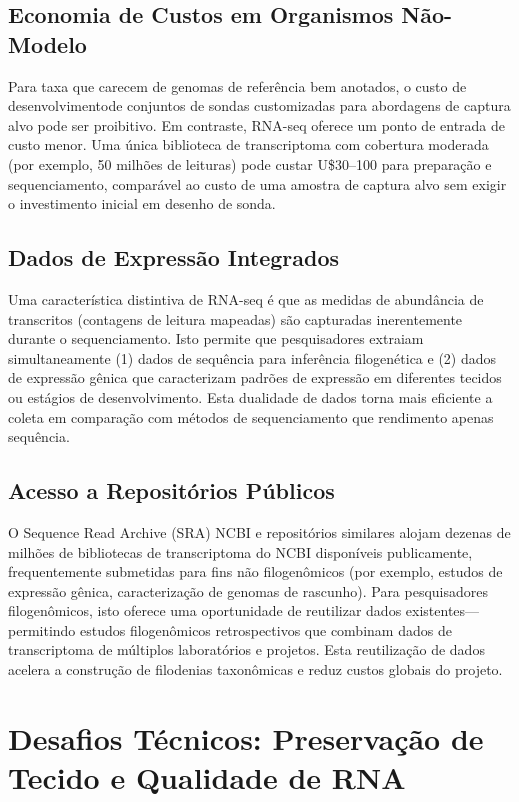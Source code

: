 \subsection{Economia de Custos em Organismos Não-Modelo}

Para taxa que carecem de genomas de referência bem anotados, o custo de desenvolvimentode conjuntos de sondas customizadas para abordagens de captura alvo pode ser proibitivo. Em contraste, RNA-seq oferece um ponto de entrada de custo menor. Uma única biblioteca de transcriptoma com cobertura moderada (por exemplo, 50 milhões de leituras) pode custar U\$30--100 para preparação e sequenciamento, comparável ao custo de uma amostra de captura alvo sem exigir o investimento inicial em desenho de sonda.

\subsection{Dados de Expressão Integrados}

Uma característica distintiva de RNA-seq é que as medidas de abundância de transcritos (contagens de leitura mapeadas) são capturadas inerentemente durante o sequenciamento. Isto permite que pesquisadores extraiam simultaneamente (1) dados de sequência para inferência filogenética e (2) dados de expressão gênica que caracterizam padrões de expressão em diferentes tecidos ou estágios de desenvolvimento. Esta dualidade de dados torna mais eficiente a coleta em comparação com métodos de sequenciamento que rendimento apenas sequência.

\subsection{Acesso a Repositórios Públicos}

O Sequence Read Archive (SRA) NCBI e repositórios similares alojam dezenas de milhões de bibliotecas de transcriptoma do NCBI disponíveis publicamente, frequentemente submetidas para fins não filogenômicos (por exemplo, estudos de expressão gênica, caracterização de genomas de rascunho). Para pesquisadores filogenômicos, isto oferece uma oportunidade de reutilizar dados existentes---permitindo estudos filogenômicos retrospectivos que combinam dados de transcriptoma de múltiplos laboratórios e projetos. Esta reutilização de dados acelera a construção de filodenias taxonômicas e reduz custos globais do projeto.

\section{Desafios Técnicos: Preservação de Tecido e Qualidade de RNA}


